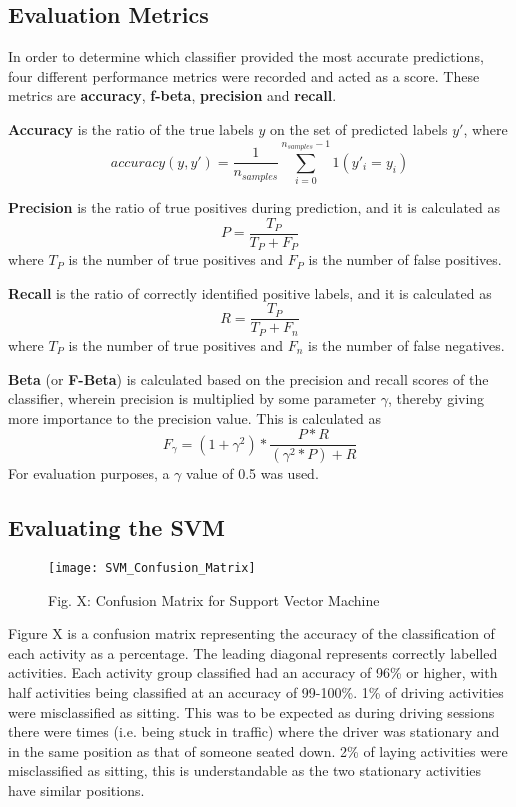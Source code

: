 \subsection{Evaluation Metrics}

In order to determine which classifier provided the most accurate predictions, four different performance metrics were recorded and acted as a score. These metrics are \textbf{accuracy},
\textbf{f-beta}, \textbf{precision} and \textbf{recall}.

\textbf{Accuracy} is the ratio of the true labels $y$ on the set of predicted labels $y'$, where \[accuracy(y, y') = \frac{1}{n_{samples}}\sum_{i=0}^{n_{samples}-1} 1(y'_i = y_i)\]

\textbf{Precision} is the ratio of true positives during prediction, and it is calculated as \[P = \frac{T_P}{T_P+F_P}\] where \(T_P\) is the number of true positives and \(F_P\) is the number of false positives.

\textbf{Recall} is the ratio of correctly identified positive labels, and it is calculated as \[R = \frac{T_P}{T_P+F_n}\] where \(T_P\) is the number of true positives and \(F_n\) is the number of false negatives.

\textbf{Beta} (or \textbf{F-Beta})  is calculated based on the precision and recall scores of the classifier, wherein precision is multiplied by some parameter $\gamma$, thereby giving more
importance to the precision value. This is calculated as \[F_\gamma = (1+\gamma^2) * \frac{P*R}{(\gamma^2*P)+R}\] For evaluation purposes, a $\gamma$ value of 0.5 was used.

\subsection{Evaluating the SVM}

\begin{figure}[h]
    \centering
    \texttt{[image: SVM\_Confusion\_Matrix]}
    \caption{Fig. X: Confusion Matrix for Support Vector Machine}
    \label{fig:SVM_Confusion}
    \end{figure}

Figure X is a confusion matrix representing the accuracy of the classification of each activity as a percentage. The leading diagonal represents correctly labelled activities. Each activity group classified had an accuracy of 96\% or higher, with half activities being classified at an accuracy of 99-100\%.
1\% of driving activities were misclassified as sitting. This was to be expected as during driving sessions there were times (i.e. being stuck in traffic) where the driver was stationary and in the same position as that of someone seated down.
2\% of laying activities were misclassified as sitting, this is understandable as the two stationary activities have similar positions.

